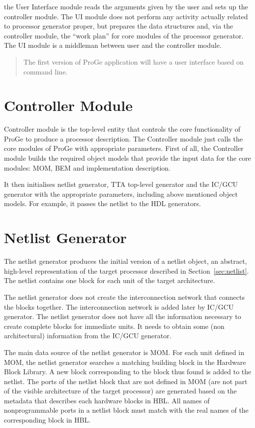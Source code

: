 \documentclass[a4paper,twoside]{tce}
\begin{document}
the User Interface module reads the arguments given by the user and sets up
the controller module. The UI module does not perform any activity actually
related to processor generator proper, but prepares the data structures and,
via the controller module, the ``work plan'' for core modules of the
processor generator. The UI module is a middleman between user and
the controller module.
%
\begin{quote}
  The first version of ProGe application will have a user interface based on
  command line.
\end{quote}

\section{Controller Module}

Controller module is the top-level entity that controls the core
functionality of ProGe to produce a processor description.  The Controller
module just calls the core modules of ProGe with appropriate parameters.
First of all, the Controller module builds the required object models that
provide the input data for the core modules: MOM, BEM and implementation
description.

It then initialises netlist generator, TTA top-level generator and the
IC/GCU generator with the appropriate parameters, including above mentioned
object models.  For example, it passes the netlist to the HDL generators.

\section{Netlist Generator}
\label{sec:netlist-generator}

The netlist generator produces the initial version of a netlist object, an
abstract, high-level representation of the target processor described in
Section~\ref{sec:netlist}. The netlist contains one block for each unit of
the target architecture.

The netlist generator does not create the interconnection network that
connects the blocks together. The interconnection network is added later by
IC/GCU generator. The netlist generator does not have all the information
necessary to create complete blocks for immediate units. It needs to obtain
some (non architectural) information from the IC/GCU generator.

The main data source of the netlist generator is MOM. For each unit defined
in MOM, the netlist generator searches a matching building block in the
Hardware Block Library. A new block corresponding to the block thus found is
added to the netlist. The ports of the netlist block that are not defined in
MOM (are not part of the visible architecture of the target processor) are
generated based on the metadata that describes each hardware blocks in HBL.
%
All names of nonprogrammable ports in a netlist block must match with the
real names of the corresponding block in HBL.
\end{document}
